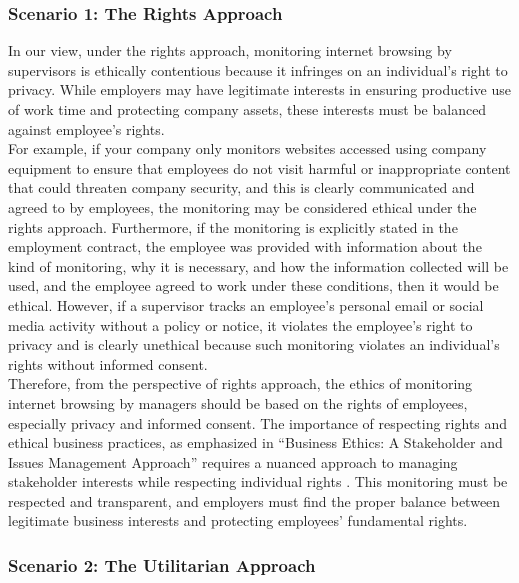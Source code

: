 \documentclass[12pt,a4paper]{article}
\begin{document}
\subsubsection{Scenario 1: The Rights Approach}

In our view, under the rights approach, monitoring internet browsing by supervisors is ethically contentious because it infringes on an individual’s right to privacy. While employers may have legitimate interests in ensuring productive use of work time and protecting company assets, these interests must be balanced against employee’s rights.\\

\noindent For example, if your company only monitors websites accessed using company equipment to ensure that employees do not visit harmful or inappropriate content that could threaten company security, and this is clearly communicated and agreed to by employees, the monitoring may be considered ethical under the rights approach. Furthermore, if the monitoring is explicitly stated in the employment contract, the employee was provided with information about the kind of monitoring, why it is necessary, and how the information collected will be used, and the employee agreed to work under these conditions, then it would be ethical. However, if a supervisor tracks an employee's personal email or social media activity without a policy or notice, it violates the employee's right to privacy and is clearly unethical because such monitoring violates an individual's rights without informed consent. \\

\noindent Therefore, from the perspective of rights approach, the ethics of monitoring internet browsing by managers should be based on the rights of employees, especially privacy and informed consent. The importance of respecting rights and ethical business practices, as emphasized in ``Business Ethics: A Stakeholder and Issues Management Approach'' requires a nuanced approach to managing stakeholder interests while respecting individual rights \citep{question_1.3}. This monitoring must be respected and transparent, and employers must find the proper balance between legitimate business interests and protecting employees' fundamental rights.


\subsubsection{Scenario 2: The Utilitarian Approach}
\end{document}
